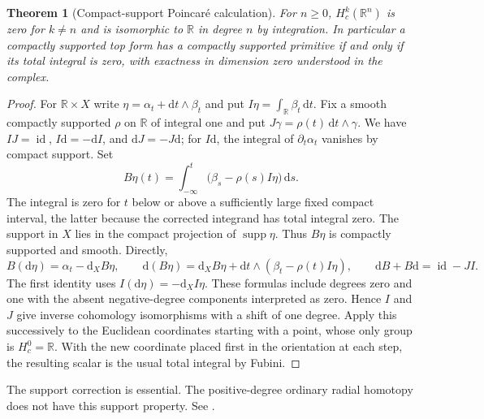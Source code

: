 \documentclass[11pt,oneside,openany]{book}
\newtheorem{theorem}{Theorem}[chapter]
\theoremstyle{definition}
\theoremstyle{remark}
\newcommand{\R}{\mathbb R}
\newcommand{\dd}{\mathrm d}
\DeclareMathOperator{\supp}{supp}
\DeclareMathOperator{\id}{id}
\begin{document}
\begin{theorem}[Compact-support Poincar\'e calculation]
\label{p104:M11.06}
For \(n\geq0\), \(H_c^k(\R^n)\) is zero for \(k\neq n\) and is
isomorphic to \(\R\) in degree \(n\) by integration. In
particular a compactly supported top form has a compactly
supported primitive if and only if its total integral is zero,
with exactness in dimension zero understood in the complex.
\end{theorem}
\begin{proof}
For \(\R\times X\) write \(\eta=\alpha_t+\dd t\wedge\beta_t\)
and put \(I\eta=\int_{\R}\beta_t\,\dd t\). Fix a smooth
compactly supported \(\rho\) on \(\R\) of integral one and put
\(J\gamma=\rho(t)\,\dd t\wedge\gamma\). We have
\(I J=\id\), \(I\dd=-\dd I\), and \(\dd J=-J\dd\); for \(I\dd\), the
integral of \(\partial_t\alpha_t\) vanishes by compact support.
Set
\[
 B\eta(t)=\int_{-\infty}^t
           \bigl(\beta_s-\rho(s)I\eta\bigr)\,\dd s .
\]
The integral is zero for \(t\) below or above a sufficiently
large fixed compact interval, the latter because the corrected
integrand has total integral zero. The support in \(X\) lies
in the compact projection of \(\supp\eta\). Thus \(B\eta\)
is compactly supported and smooth. Directly,
\[
  B(\dd\eta)=\alpha_t-\dd_XB\eta,\qquad
  \dd(B\eta)=\dd_XB\eta+\dd t\wedge(\beta_t-\rho(t)I\eta),
  \qquad \dd B+B\dd=\id-JI.
\]
The first identity uses \(I(\dd\eta)=-\dd_XI\eta\). These formulas
include degrees zero and one with the absent negative-degree
components interpreted as zero. Hence \(I\) and \(J\) give
inverse cohomology isomorphisms with a shift of one degree.
Apply this successively to the Euclidean coordinates starting
with a point, whose only group is \(H_c^0=\R\).
With the new coordinate placed first in the orientation at
each step, the resulting scalar is the usual total integral
by Fubini.
\end{proof}
The support correction is essential. The positive-degree
ordinary radial homotopy does not have this support property.
See \cite[Lemma 17.27 and Theorem 17.28]{lee}.
\end{document}
